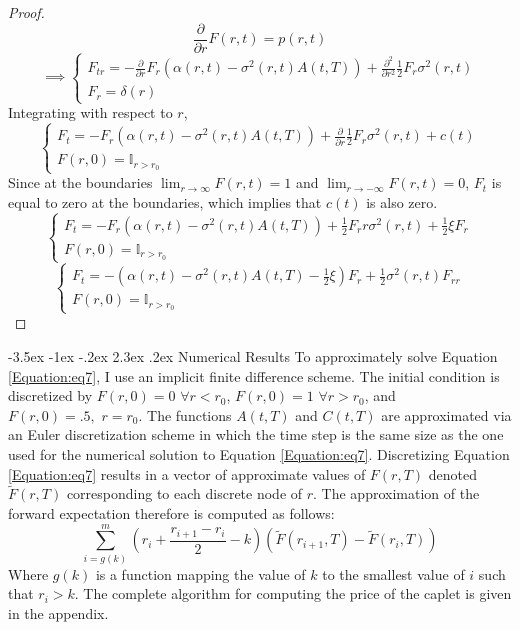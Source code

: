 \documentclass[12pt]{article}
\makeatletter
\renewcommand\section{\@startsection{section}{1}{\z@}%
                                  {-3.5ex \@plus -1ex \@minus -.2ex}%
                                  {2.3ex \@plus.2ex}%
                                  {\normalfont\large\bfseries}}
\theoremstyle{definition}
\theoremstyle{remark}
\makeatother
\begin{document}
\begin{proof}
\[\frac{\partial}{\partial r} F(r, t)=p(r, t)\]
\begin{equation*} \implies \left \{\begin{array}{rl} F_{tr}=-\frac{\partial}{\partial r} F_r \left(\alpha(r, t)-\sigma^2(r, t)A(t, T)\right)+\frac{\partial ^2}{\partial r^2} \frac{1}{2}F_r\sigma^2 (r, t) \\
F_r =\delta(r)
\end{array}
\right.
\end{equation*}
Integrating with respect to \(r\), 
\begin{equation*} \left \{\begin{array}{rl} F_{t}=- F_r \left(\alpha(r, t)-\sigma^2(r, t)A(t, T)\right)+\frac{\partial }{\partial r} \frac{1}{2}F_r\sigma^2 (r, t) +c(t) \\
F(r, 0)=\mathbb{I}_{r>r_0}
\end{array}
\right.
\end{equation*}
Since at the boundaries \(\lim_{r\to \infty} F(r, t)=1\) and \(\lim_{r \to -\infty} F(r, t)=0\), \(F_t\) is equal to zero at the boundaries, which implies that \(c(t)\) is also zero.
\begin{equation*} \left \{\begin{array}{rl} F_{t}=- F_r \left(\alpha(r, t)-\sigma^2(r, t)A(t, T)\right)+ \frac{1}{2}F_rr\sigma^2 (r, t) +\frac{1}{2}\xi F_r \\
F(r, 0)=\mathbb{I}_{r>r_0}
\end{array}
\right.
\end{equation*}
\begin{equation*} \left \{ \begin{array}{rl} 
F_t=-\left(\alpha(r, t)-\sigma^2(r, t)A(t, T)-\frac{1}{2} \xi \right) F_r +\frac{1}{2} \sigma^2 (r, t) F_{rr} \\
F(r, 0)=\mathbb{I}_{r>r_0}
\end{array} 
\right.
\end{equation*}
\end{proof}
\section{Numerical Results}
To approximately solve Equation \ref{Equation:eq7}, I use an implicit finite difference scheme.  The initial condition is discretized by \(F(r, 0)=0 \,\, \forall r<r_0\), \(F(r, 0)=1 \,\, \forall r>r_0\), and \(F(r, 0)=.5,\,\, r=r_0\).  The functions  \(A(t, T)\) and \(C(t, T)\) are approximated via an Euler discretization scheme in which the time step is the same size as the one used for the numerical solution to Equation \ref{Equation:eq7}.  Discretizing Equation \ref{Equation:eq7} results in a vector of approximate values of \(F(r, T)\) denoted \(\tilde{F}(r, T)\) corresponding to each discrete node of \(r\).  The approximation of the forward expectation therefore is computed as follows:
\[\sum_ {i=g(k)} ^m \left(r_i+\frac{r_{i+1}-r_{i}}{2}-k\right)\left(\tilde{F}(r_{i+1}, T)-\tilde{F}(r_{i}, T)\right) \]
Where \(g(k)\) is a function mapping the value of \(k\) to the smallest value of \(i\) such that \(r_i >k\).
The complete algorithm for computing the price of the caplet is given in the appendix.
\end{document}
